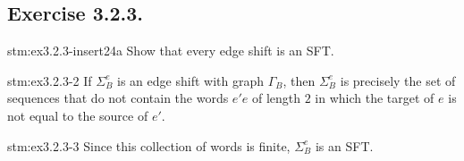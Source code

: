 \subsection*{Exercise 3.2.3.}

\begin{exercise}{stm:ex3.2.3-insert24a}
Show that every edge shift is an SFT.
\end{exercise}

\begin{statement}{stm:ex3.2.3-2}
If $\Sigma_B^e$ is an edge shift with graph $\Gamma_B$, then $\Sigma_B^e$ is precisely the set of sequences that do not contain the words $e'e$ of length $2$ in which the target of $e$ is not equal to the source of $e'$.
\end{statement}

\begin{statement}{stm:ex3.2.3-3}
Since this collection of words is finite, $\Sigma_B^e$ is an SFT.
\end{statement}
